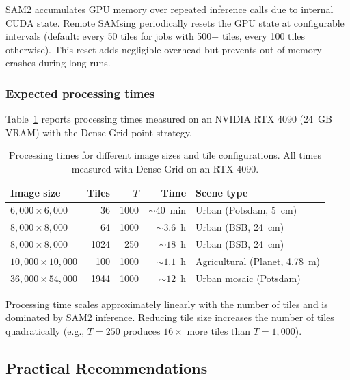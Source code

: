 \documentclass[review,11pt,authoryear]{elsarticle}
\begin{document}
SAM2 accumulates GPU memory over repeated inference calls due to internal CUDA state. Remote SAMsing periodically resets the GPU state at configurable intervals (default: every 50 tiles for jobs with 500+ tiles, every 100 tiles otherwise). This reset adds negligible overhead but prevents out-of-memory crashes during long runs.

\subsubsection{Expected processing times}

Table~\ref{tab:times} reports processing times measured on an NVIDIA RTX 4090 (24~GB VRAM) with the Dense Grid point strategy.

\begin{table}[htbp]
\centering
\caption{Processing times for different image sizes and tile configurations. All times measured with Dense Grid on an RTX 4090.}
\label{tab:times}
\begin{tabular}{lrrrl}
\toprule
Image size & Tiles & $T$ & Time & Scene type \\
\midrule
$6{,}000 \times 6{,}000$ & 36 & 1000 & ${\sim}40$~min & Urban (Potsdam, 5~cm) \\
$8{,}000 \times 8{,}000$ & 64 & 1000 & ${\sim}3.6$~h & Urban (BSB, 24~cm) \\
$8{,}000 \times 8{,}000$ & 1024 & 250 & ${\sim}18$~h & Urban (BSB, 24~cm) \\
$10{,}000 \times 10{,}000$ & 100 & 1000 & ${\sim}1.1$~h & Agricultural (Planet, 4.78~m) \\
$36{,}000 \times 54{,}000$ & 1944 & 1000 & ${\sim}12$~h & Urban mosaic (Potsdam) \\
\bottomrule
\end{tabular}
\end{table}

\noindent
Processing time scales approximately linearly with the number of tiles and is dominated by SAM2 inference. Reducing tile size increases the number of tiles quadratically (e.g., $T = 250$ produces $16\times$ more tiles than $T = 1{,}000$).


\subsection{Practical Recommendations}
\label{sec:recommendations}
\end{document}
